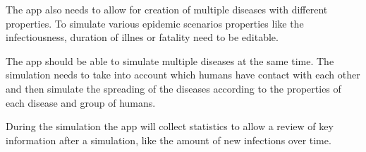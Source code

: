 The app also needs to allow for creation of multiple diseases with different properties.
To simulate various epidemic scenarios properties like the infectiousness, duration of illnes
or fatality need to be editable. 

The app should be able to simulate multiple diseases at the same time. The simulation needs
to take into account which humans have contact with each other and then simulate the spreading
of the diseases according to the properties of each disease and group of humans.

During the simulation the app will collect statistics to allow a review of key information
after a simulation, like the amount of new infections over time.